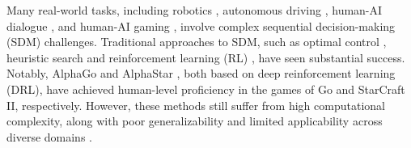 \documentclass{article} %
\theoremstyle{plain}
\theoremstyle{definition}
\theoremstyle{remark}
\begin{document}
Many real-world tasks, including robotics \citep{polydoros2017survey, brunke2022safe, rana2023residual}, autonomous driving \citep{naranjo2005power, song2022quantum}, human-AI dialogue \citep{mctear2022conversational, li2019dialogue}, and human-AI gaming \citep{yan2024efficient, granter2017alphago}, involve complex sequential decision-making (SDM) challenges. Traditional approaches to SDM, such as optimal control \citep{garcia1989model}, heuristic search \citep{swiechowski2023monte} and reinforcement learning (RL) \citep{mnih2013playing}, have seen substantial success. Notably, AlphaGo \citep{44806} and AlphaStar \citep{vinyals2019grandmaster}, both based on deep reinforcement learning (DRL), have achieved human-level proficiency in the games of Go and StarCraft II, respectively. However, these methods still suffer from high computational complexity, along with poor generalizability and limited applicability across diverse domains \citep{dulac2015deep,cobbe2019quantifying}. %


\end{document}
